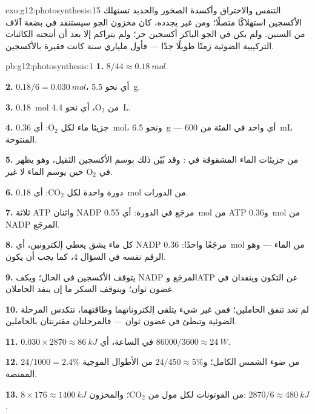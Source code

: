 \begin{solution}{exo:g12:photosynthesis:15}
التنفس والاحتراق وأكسدة الصخور والحديد تستهلك الأكسجين استهلاكًا
متصلًا؛ ومن غير  يجدده، كان مخزون الجو سيستنفد في بضعة آلاف
من السنين. ولم يكن في الجو الباكر أكسجين حر؛ ولم يتراكم إلا بعد أن
أنتجته الكائنات التركيبية الضوئية زمنًا طويلًا جدًا --- فأول ملياري سنة
كانت فقيرة بالأكسجين.
\end{solution}

\begin{solution}{pb:g12:photosynthesis:1}
\textbf{1.} $8/44 \approx \qty{0.18}{mol}$.

\textbf{2.} $0.18/6 = \qty{0.030}{mol}$، أي نحو \qty{5.5}{g}.

\textbf{3.} \qty{0.18}{mol} من $\mathrm{O_2}$، أي نحو \qty{4.4}{L}.

\textbf{4.} جزيئا ماء لكل $\mathrm{O_2}$: أي \qty{0.36}{mol}،
ونحو \qty{6.5}{g} --- أي واحد في المئة من \qty{600}{mL} المنتوحة.

\textbf{5.} من جزيئات الماء المشقوقة في : وقد بُيّن ذلك
بوسم الأكسجين الثقيل، وهو يظهر في $\mathrm{O_2}$ حين يوسم الماء لا
غير.

\textbf{6.} دورة واحدة لكل $\mathrm{CO_2}$: أي \qty{0.18}{mol} من الدورات.

\textbf{7.} ثلاثة ATP واثنان NADP مرجَع في الدورة: أي \qty{0.55}{mol}
من ATP و\qty{0.36}{mol} من NADP المرجَع.

\textbf{8.} كل ماء يشق يعطي إلكترونين، أي NADP مرجَعًا واحدًا:
\qty{0.36}{mol} من الماء --- وهو الرقم نفسه في السؤال 4، كما يجب أن
يكون.

\textbf{9.} يتوقف الأكسجين في الحال؛ ويكف NADP المرجَع وATP عن التكون
وينفدان في غضون ثوان؛ ويتوقف السكر ما إن ينفد الحاملان.

\textbf{10.} لم تعد  تنفق الحاملين؛ فمن غير شيء يتلقى
إلكتروناتهما وطاقتهما، تتكدس المرحلة الضوئية وتبطئ في غضون ثوان ---
فالمرحلتان مقترنتان بالحاملين.

\textbf{11.} $0.030 \times 2870 \approx \qty{86}{kJ}$ في الساعة، أي
$86000/3600 \approx \qty{24}{W}$.

\textbf{12.} $24/1000 = 2.4\%$ من ضوء الشمس الكامل؛ و$24/450 \approx
5\%$ من الأطوال الموجية الممتصة.

\textbf{13.} $8 \times 176 \approx \qty{1400}{kJ}$ من الفوتونات لكل
مول من $\mathrm{CO_2}$؛ والمخزون: $2870/6 \approx \qty{480}{kJ}$.


\end{solution}
